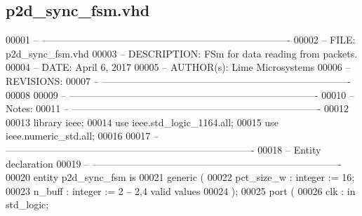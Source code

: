 \subsection{p2d\+\_\+sync\+\_\+fsm.\+vhd}
\label{p2d__sync__fsm_8vhd_source}

\begin{DoxyCode}
00001 \textcolor{keyword}{-- ---------------------------------------------------------------------------- }
00002 \textcolor{keyword}{-- FILE:    p2d\_sync\_fsm.vhd}
00003 \textcolor{keyword}{-- DESCRIPTION: FSm for data reading from packets.}
00004 \textcolor{keyword}{-- DATE:    April 6, 2017}
00005 \textcolor{keyword}{-- AUTHOR(s):   Lime Microsystems}
00006 \textcolor{keyword}{-- REVISIONS:}
00007 \textcolor{keyword}{-- ---------------------------------------------------------------------------- }
00008 
00009 \textcolor{keyword}{-- ----------------------------------------------------------------------------}
00010 \textcolor{keyword}{-- Notes:}
00011 \textcolor{keyword}{-- ----------------------------------------------------------------------------}
00012 
00013 \textcolor{vhdlkeyword}{library }\textcolor{keywordflow}{ieee};
00014 \textcolor{vhdlkeyword}{use }ieee.std\_logic\_1164.\textcolor{keywordflow}{all};
00015 \textcolor{vhdlkeyword}{use }ieee.numeric\_std.\textcolor{keywordflow}{all};
00016 
00017 \textcolor{keyword}{-- ----------------------------------------------------------------------------}
00018 \textcolor{keyword}{-- Entity declaration}
00019 \textcolor{keyword}{-- ----------------------------------------------------------------------------}
00020 \textcolor{keywordflow}{entity }p2d_sync_fsm \textcolor{keywordflow}{is}
00021    \textcolor{keywordflow}{generic} \textcolor{vhdlchar}{(}
00022       \textcolor{vhdlchar}{pct_size_w}           \textcolor{vhdlchar}{:} \textcolor{comment}{integer} \textcolor{vhdlchar}{:=} \textcolor{vhdllogic}{}\textcolor{vhdllogic}{16};
00023       \textcolor{vhdlchar}{n_buff}               \textcolor{vhdlchar}{:} \textcolor{comment}{integer} \textcolor{vhdlchar}{:=} \textcolor{vhdllogic}{}\textcolor{vhdllogic}{2}\textcolor{keyword}{ -- 2,4 valid values}
00024    \textcolor{vhdlchar}{)};
00025    \textcolor{keywordflow}{port} \textcolor{vhdlchar}{(}
00026       \textcolor{vhdlchar}{clk}                  \textcolor{vhdlchar}{:} \textcolor{keywordflow}{in} \textcolor{comment}{std\_logic};

\end{DoxyCode}

